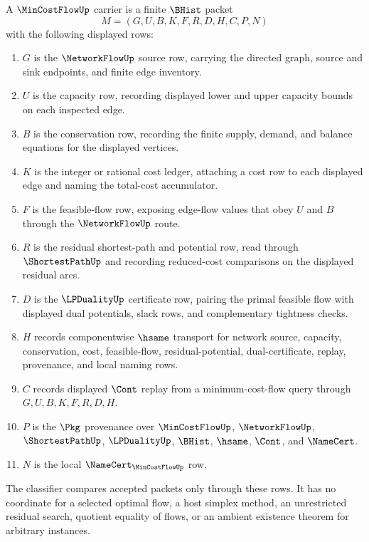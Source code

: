 \begin{definition}
\label{def:min-cost-flow-carrier}
A $\MinCostFlowUp$ carrier is a finite $\BHist$ packet
$$
M=(G,U,B,K,F,R,D,H,C,P,N)
$$
with the following displayed rows:
\begin{enumerate}
\item $G$ is the $\NetworkFlowUp$ source row, carrying the directed graph, source and sink endpoints, and finite edge inventory.
\item $U$ is the capacity row, recording displayed lower and upper capacity bounds on each inspected edge.
\item $B$ is the conservation row, recording the finite supply, demand, and balance equations for the displayed vertices.
\item $K$ is the integer or rational cost ledger, attaching a cost row to each displayed edge and naming the total-cost accumulator.
\item $F$ is the feasible-flow row, exposing edge-flow values that obey $U$ and $B$ through the $\NetworkFlowUp$ route.
\item $R$ is the residual shortest-path and potential row, read through $\ShortestPathUp$ and recording reduced-cost comparisons on the displayed residual arcs.
\item $D$ is the $\LPDualityUp$ certificate row, pairing the primal feasible flow with displayed dual potentials, slack rows, and complementary tightness checks.
\item $H$ records componentwise $\hsame$ transport for network source, capacity, conservation, cost, feasible-flow, residual-potential, dual-certificate, replay, provenance, and local naming rows.
\item $C$ records displayed $\Cont$ replay from a minimum-cost-flow query through $G,U,B,K,F,R,D,H$.
\item $P$ is the $\Pkg$ provenance over $\MinCostFlowUp$, $\NetworkFlowUp$, $\ShortestPathUp$, $\LPDualityUp$, $\BHist$, $\hsame$, $\Cont$, and $\NameCert$.
\item $N$ is the local $\NameCert_{\MinCostFlowUp}$ row.
\end{enumerate}
The classifier compares accepted packets only through these rows. It has no coordinate for a selected optimal flow, a host simplex method, an unrestricted residual search, quotient equality of flows, or an ambient existence theorem for arbitrary instances.
\end{definition}

